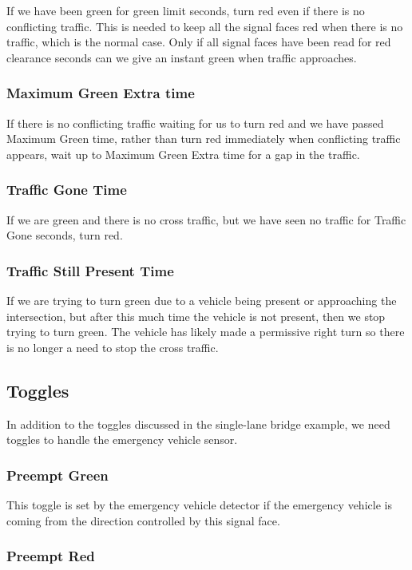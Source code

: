 \documentclass[letterpaper,twoside]{article}
\begin{document}
If we have been green for green limit seconds, turn red even if there
is no conflicting traffic.  This is needed to keep all the signal faces
red when there is no traffic, which is the normal case.  Only if all
signal faces have been read for red clearance seconds can we give
an instant green when traffic approaches.

\subsubsection{Maximum Green Extra time}

If there is no conflicting traffic waiting for us to turn red and we have
passed Maximum Green time, rather than turn red immediately when conflicting
traffic appears, wait up to Maximum Green Extra time for a gap in the traffic.

\subsubsection{Traffic Gone Time}
If we are green and there is no cross traffic, but we have seen no traffic
for Traffic Gone seconds, turn red.

\subsubsection{Traffic Still Present Time}
If we are trying to turn green due to a vehicle being present or approaching
the intersection, but after this much time the vehicle is not present, then
we stop trying to turn green.  The vehicle has likely made a permissive right
turn so there is no longer a need to stop the cross traffic.

\subsection{Toggles}

In addition to the toggles discussed in the single-lane bridge example,
we need toggles to handle the emergency vehicle sensor.

\subsubsection{Preempt Green}

This toggle is set by the emergency vehicle detector if the emergency
vehicle is coming from the direction controlled by this signal face.

\subsubsection{Preempt Red}
\end{document}
